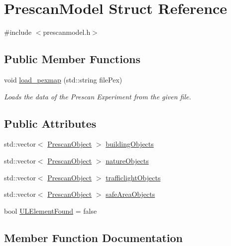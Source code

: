 \hypertarget{structPrescanModel}{}\section{Prescan\+Model Struct Reference}
\label{structPrescanModel}


{\ttfamily \#include $<$prescanmodel.\+h$>$}

\subsection*{Public Member Functions}
\begin{DoxyCompactItemize}
\item 
void \hyperlink{structPrescanModel_af6da8d8fc4752a40d5430e926756cae5}{load\+\_\+pexmap} (std\+::string file\+Pex)
\begin{DoxyCompactList}\small\item\em Loads the data of the Prescan Experiment from the given file. \end{DoxyCompactList}\end{DoxyCompactItemize}
\subsection*{Public Attributes}
\begin{DoxyCompactItemize}
\item 
std\+::vector$<$ \hyperlink{structPrescanObject}{Prescan\+Object} $>$ \hyperlink{structPrescanModel_a64be71696406702451ae290cb3e33a74}{building\+Objects}
\item 
std\+::vector$<$ \hyperlink{structPrescanObject}{Prescan\+Object} $>$ \hyperlink{structPrescanModel_a35c4b0fa33aec2275cc4673f19582b03}{nature\+Objects}
\item 
std\+::vector$<$ \hyperlink{structPrescanObject}{Prescan\+Object} $>$ \hyperlink{structPrescanModel_aaf9cd990920b3c18a5d44fcae199b423}{trafficlight\+Objects}
\item 
std\+::vector$<$ \hyperlink{structPrescanObject}{Prescan\+Object} $>$ \hyperlink{structPrescanModel_aee74a3792c6451c478efcf6bfeb5da7b}{safe\+Area\+Objects}
\item 
bool \hyperlink{structPrescanModel_a47982a5c335b6b3ec656027d7b1afa8b}{U\+L\+Element\+Found} = false
\end{DoxyCompactItemize}


\subsection{Member Function Documentation}
\mbox{\label{structPrescanModel_af6da8d8fc4752a40d5430e926756cae5}} 
